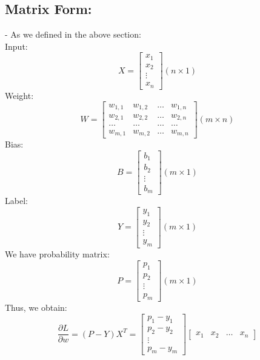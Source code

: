 \documentclass{article}
\begin{document}
    \subsection*{Matrix Form:}
    - As we defined in the above section: \\
    Input:
    \[
        X = 
        \begin{bmatrix}
            x_1 \\
            x_2 \\
            \vdots \\
            x_n
        \end{bmatrix} (n \times 1)
    \]
    Weight: 
    \[
        W = 
        \begin{bmatrix}
            w_{1, 1} & w_{1, 2} & \hdots & w_{1, n} \\
            w_{2, 1} & w_{2, 2} & \hdots & w_{2, n} \\
            \hdots & \hdots & \hdots & \hdots \\
            w_{m, 1} & w_{m, 2} & \hdots & w_{m, n}
        \end{bmatrix} (m \times n)
    \]
    Bias: 
    \[
        B = 
        \begin{bmatrix}
            b_1 \\
            b_2 \\
            \vdots \\
            b_m
        \end{bmatrix} (m \times 1)
    \]
    Label:
    \[
        Y = 
        \begin{bmatrix}
            y_1 \\
            y_2 \\
            \vdots \\
            y_m
        \end{bmatrix} (m \times 1)
    \]
    We have probability matrix:
    \[
        P = \begin{bmatrix}
            p_1 \\
            p_2 \\
            \vdots \\
            p_m
        \end{bmatrix} (m \times 1)
    \]
    Thus, we obtain: 
    \[
        \frac{\partial L}{\partial w} = (P - Y)X^T = 
        \begin{bmatrix}
            p_1 - y_1 \\
            p_2 - y_2 \\
            \vdots \\
            p_m - y_m
        \end{bmatrix}
        \begin{bmatrix}
            x_1 & x_2 & \hdots & x_n
        \end{bmatrix}
    \]
\end{document}
